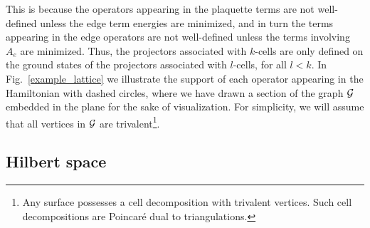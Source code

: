 This is because the operators appearing in the plaquette terms are not well-defined unless the edge term energies are minimized, and in turn the terms appearing in the edge operators are not well-defined unless the terms involving $A_e$ are minimized.
Thus, the projectors associated with $k$-cells are only defined on the ground states of the projectors associated with $l$-cells, for all $l<k$.  
In Fig.~\ref{example_lattice} we illustrate the support of each operator appearing in the Hamiltonian with dashed circles, where we have drawn a section of the graph $\mathcal{G}$ embedded in the plane for the sake of visualization. 
For simplicity, we will assume that all vertices in $\mathcal{G}$ are trivalent\footnote{Any surface possesses a cell decomposition with trivalent vertices.
Such cell decompositions are Poincar\'e dual to triangulations.}.




\subsection{Hilbert space} \label{hilbertspacesect}

